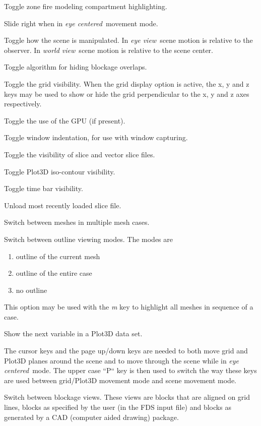 \documentclass[11pt,twoside]{book}
\newcommand{\kitem}[1]{\item[{\bf {\tt #1 \  }} \hfill]}
\begin{document}
\kitem{C}Toggle zone fire modeling compartment highlighting.

\kitem{d,D}Slide right when in {\em eye centered}\ movement mode.

\kitem{e,E}Toggle how the scene is manipulated.  In {\em eye
view}\ scene motion is relative to the observer.  In {\em world
view}\ scene motion is relative to the scene center.

\kitem{F}Toggle algorithm for hiding blockage overlaps.

\kitem{g}Toggle the grid visibility.  When the grid display option
is active, the x, y and z keys may be used to show or hide the
grid perpendicular to the x, y and z axes respectively.

\kitem{G}Toggle the use of the GPU (if present).

 \kitem{h}Toggle window indentation, for use with window
capturing.

\kitem{H}Toggle the visibility of slice and vector slice files.

\kitem{i,I}Toggle Plot3D iso-contour visibility.

\kitem{k,K}Toggle time bar visibility.

\kitem{L}Unload most recently loaded slice file.


\kitem{m,M}Switch between meshes in multiple mesh cases.

\kitem{o,O}Switch between outline viewing modes. The modes are
\begin{enumerate}
\item outline of the current mesh
\item outline of the entire case
\item no outline
\end{enumerate}
This option may be used with the {\em m} key to highlight all meshes in sequence of a case.

\kitem{p}Show the next variable in a Plot3D data set.

\kitem{P}The cursor keys and the page up/down keys are needed to
both move grid and Plot3D planes around the scene and to move
through the scene while in {\em eye centered}\ mode.  The upper
case ``P`` key is then used to switch the way these keys are used
between grid/Plot3D movement mode and scene movement mode.


\kitem{q,Q}Switch between blockage views.  These views are blocks
that are aligned on grid lines, blocks as specified by the user
(in the FDS input file) and blocks as generated by a CAD (computer
aided drawing) package.
\end{document}
